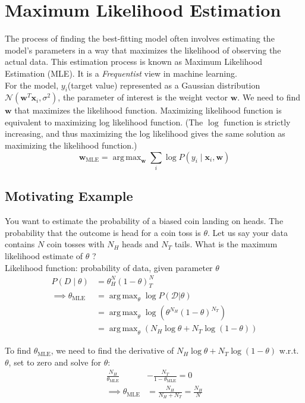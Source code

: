 \documentclass{report}
\newcommand{\w}{\mathbf{w}} %
\newcommand{\x}{\mathbf{x}}
\newcommand{\D}{\mathcal{D}}
\DeclareMathOperator*{\argmax}{arg\,max}
\begin{document}
\section{Maximum Likelihood Estimation}

The process of finding the best-fitting model often involves estimating the model's parameters in a way that maximizes the likelihood of observing the actual data. This estimation process is known as Maximum Likelihood Estimation (MLE). It is a \textit{Frequentist} view in machine learning. \\

For the model, $y_i$(target value) represented as a Gaussian distribution $\mathcal{N}(\w^T\x_i, \sigma^2)$, the parameter of interest is the weight vector $\w$. We need to find $\w$ that maximizes the likelihood function. Maximizing likelihood function is equivalent to maximizing log likelihood function. (The $\log$ function is strictly increasing, and thus maximizing the log likelihood gives the same solution as maximizing the likelihood function.)
$$
  \w_{\text{MLE}} = \argmax_{\w} \underset{i}\sum \log P(y_i \mid \x_i, \w)
$$

\subsection{Motivating Example}
You want to estimate the probability of a biased coin landing on heads. The probability that the outcome is head for a coin toss is $\theta$.  Let us say your data contains $N$ coin tosses with $N_H$ heads and $N_T$ tails. What is the maximum likelihood estimate of $\theta$ ?\\

Likelihood function: probability of data, given parameter $\theta$
\begin{align*}
  P(D\mid\theta)               & = \theta^N_H(1-\theta)^N_T                                              \\
  \implies \theta_{\text{MLE}} & = \argmax_{\theta} \log P(\D|\theta)                                    \\
                               & = \argmax_{\theta} \log \left( \theta^{N_H} (1-\theta)^{N_T} \right)    \\
                               & = \argmax_{\theta} \left( N_H \log \theta + N_T \log (1-\theta) \right)
\end{align*}

To find $\theta_{\text{MLE}}$, we need to find the derivative of $N_H \log \theta + N_T \log (1-\theta)$ w.r.t. $\theta$, set to zero and solve for $\theta$:
\begin{align*}
  \frac{N_H}{\theta_{\text{MLE}}} & - \frac{N_T}{1-\theta_{\text{MLE}}} = 0 \\
  \implies \theta_{\text{MLE}}    & =\frac{N_H}{N_H+N_T}=\frac{N_H}{N}
\end{align*}
\end{document}
